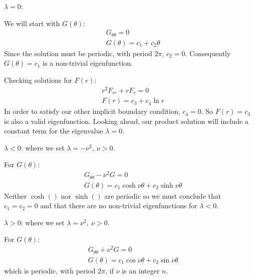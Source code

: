 \vspace{0.15cm}

\noindent\underline{$\lambda = 0$}:

\vspace{0.1cm}

\noindent We will start with $G(\theta)$:
\begin{align*}
&G_{\theta \theta} = 0 \\
&G(\theta) = c_1 + c_2\theta
\end{align*}
Since the solution must be periodic, with period $2\pi$, $c_2 = 0$.  Consequently $G(\theta) = c_1$ is a non-trivial eigenfunction.

Checking solutions for $F(r)$:
\begin{align*}
&r^2F_{rr} + rF_{r} = 0 \\
&F(r) = c_3 + c_4 \ln{r}
\end{align*}
In order to satisfy our other implicit boundary condition, $c_4 = 0$.  So $F(r)=  c_3$ is also a valid eigenfunction.  Looking ahead, our product solution will include a constant term for the eigenvalue $\lambda = 0$.

\vspace{0.15cm}

\noindent\underline{$\lambda < 0$}: where we set $\lambda = -\nu^2, \ \nu>0$.

For $G(\theta)$:
\begin{align*}
&G_{\theta \theta} - \nu^2 G = 0 \\
&G(\theta) = c_1 \cosh{\nu \theta} + c_2 \sinh{\nu \theta}
\end{align*}
Neither $\cosh{()}$ nor $\sinh{()}$ are periodic so we must conclude that $c_1 = c_2 = 0$ and that there are no non-trivial eigenfunctions for $\lambda < 0$.


\vspace{0.15cm}

\noindent\underline{$\lambda > 0$}: where we set $\lambda = \nu^2, \ \nu>0$.

For $G(\theta)$:
\begin{align*}
&G_{\theta \theta} + \nu^2 G = 0 \\
&G(\theta) = c_1 \cos{\nu \theta} + c_2 \sin{\nu \theta}
\end{align*}
which is periodic, with period $2\pi$, if $\nu$ is an integer $n$.

